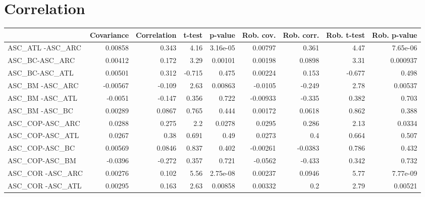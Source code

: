 \section{Correlation}
\begin{tabular}{lrrrrrrrr}
\toprule
{} &  Covariance &  Correlation &  t-test &  p-value &  Rob. cov. &  Rob. corr. &  Rob. t-test &  Rob. p-value \\
\midrule
ASC\_ATL -ASC\_ARC                        &     0.00858 &        0.343 &    4.16 & 3.16e-05 &    0.00797 &       0.361 &         4.47 &      7.65e-06 \\
ASC\_BC-ASC\_ARC                          &     0.00412 &        0.172 &    3.29 &  0.00101 &    0.00198 &      0.0898 &         3.31 &      0.000937 \\
ASC\_BC-ASC\_ATL                          &     0.00501 &        0.312 &  -0.715 &    0.475 &    0.00224 &       0.153 &       -0.677 &         0.498 \\
ASC\_BM -ASC\_ARC                         &    -0.00567 &       -0.109 &    2.63 &  0.00863 &    -0.0105 &      -0.249 &         2.78 &       0.00537 \\
ASC\_BM -ASC\_ATL                         &     -0.0051 &       -0.147 &   0.356 &    0.722 &   -0.00933 &      -0.335 &        0.382 &         0.703 \\
ASC\_BM -ASC\_BC                          &     0.00289 &       0.0867 &   0.765 &    0.444 &    0.00172 &      0.0618 &        0.862 &         0.388 \\
ASC\_COP-ASC\_ARC                         &      0.0288 &        0.275 &     2.2 &   0.0278 &     0.0295 &       0.286 &         2.13 &        0.0334 \\
ASC\_COP-ASC\_ATL                         &      0.0267 &         0.38 &   0.691 &     0.49 &     0.0273 &         0.4 &        0.664 &         0.507 \\
ASC\_COP-ASC\_BC                          &     0.00569 &       0.0846 &   0.837 &    0.402 &   -0.00261 &     -0.0383 &        0.786 &         0.432 \\
ASC\_COP-ASC\_BM                          &     -0.0396 &       -0.272 &   0.357 &    0.721 &    -0.0562 &      -0.433 &        0.342 &         0.732 \\
ASC\_COR -ASC\_ARC                        &     0.00276 &        0.102 &    5.56 & 2.75e-08 &    0.00237 &      0.0946 &         5.77 &      7.77e-09 \\
ASC\_COR -ASC\_ATL                        &     0.00295 &        0.163 &    2.63 &  0.00858 &    0.00332 &         0.2 &         2.79 &       0.00521 \\

\end{tabular}
